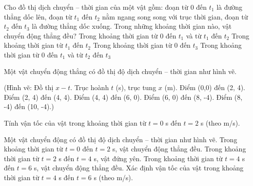 \begin{ex}
Cho đồ thị dịch chuyển – thời gian của một vật gồm: đoạn từ $0$ đến $t_1$ là đường thẳng dốc lên, đoạn từ $t_1$ đến $t_2$ nằm ngang song song với trục thời gian, đoạn từ $t_2$ đến $t_3$ là đường thẳng dốc xuống. Trong những khoảng thời gian nào, vật chuyển động thẳng đều?
\choice
{Trong khoảng thời gian từ 0 đến $t_1$ và từ $t_1$ đến $t_2$}
{Trong khoảng thời gian từ $t_1$ đến $t_2$}
{Trong khoảng thời gian từ 0 đến $t_3$}
{\True Trong khoảng thời gian từ 0 đến $t_1$ và từ $t_2$ đến $t_3$}
\end{ex}
\begin{ex}
  Một vật chuyển động thẳng có đồ thị độ dịch chuyển – thời gian như hình vẽ.
  
  (Hình vẽ: Đồ thị $x-t$. Trục hoành $t$ (s), trục tung $x$ (m).
  Điểm (0,0) đến (2, 4).
  Điểm (2, 4) đến (4, 4).
  Điểm (4, 4) đến (6, 0).
  Điểm (6, 0) đến (8, -4).
  Điểm (8, -4) đến (10, -4).)
  
  Tính vận tốc của vật trong khoảng thời gian từ $t = 0$ s đến $t = 2$ s (theo m/s).
\end{ex}

\begin{ex}
Một vật chuyển động có đồ thị độ dịch chuyển – thời gian như hình vẽ.
Trong khoảng thời gian từ $t = 0$ đến $t = 2$ s, vật chuyển động thẳng đều.
Trong khoảng thời gian từ $t = 2$ s đến $t = 4$ s, vật đứng yên.
Trong khoảng thời gian từ $t = 4$ s đến $t = 6$ s, vật chuyển động thẳng đều.
Xác định vận tốc của vật trong khoảng thời gian từ $t = 4$ s đến $t = 6$ s (theo m/s).
\end{ex}

